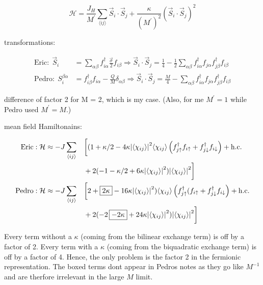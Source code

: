 \documentclass{article}
\begin{document}
\begin{equation}
\mathcal{H} = \frac{J_H}{M^\prime} \sum_{\langle ij \rangle} \vec{S}_i \cdot \vec{S}_j + \frac{\kappa}{\left(M^\prime\right)^2} \left(\vec{S}_i \cdot \vec{S}_j\right)^2
\end{equation}


transformations:

\begin{align}
\text{Eric}: \;\vec{S}_i &= \sum_{\alpha\beta} f_{i\alpha}^\dagger \frac{\vec{\sigma}}{2} f_{i\beta} \Rightarrow \vec{S}_i\cdot\vec{S}_j = \frac14 - \frac12 \sum_{\alpha\beta} f_{i\alpha}^\dagger f_{j\alpha} f_{j\beta}^\dagger f_{i\beta} \\
\text{Pedro}: \; S_i^{\beta \alpha} &= f_{i\beta}^\dagger f_{i\alpha} - \frac{Q}{M} \delta_{\alpha \beta} \Rightarrow \vec{S}_i \cdot \vec{S}_j = \frac{M}{4} - \sum_{\alpha \beta} f_{i\alpha}^\dagger f_{j\alpha} f_{j\beta}^\dagger f_{i\beta} 
\end{align}

difference of factor 2 for M = 2, which is my case. (Also, for me $M^\prime = 1$ while Pedro used $M^\prime = M$.) 

mean field Hamiltonains:

\begin{alignat}{2}
	\text{Eric}: \mathcal{H} &\approx -J\sum_{\langle ij \rangle} &&\bigg[ (1+\kappa/2 - 4\kappa\abs{\langle \chi_{ij} \rangle}^2 \langle \chi_{ij} \rangle \left( f_{j\uparrow}^\dagger f_{i\uparrow} + f_{j\downarrow}^\dagger f_{i\downarrow}\right) + \text{h.c.} \\
	& && +2(-1-\kappa/2 + 6\kappa \abs{\langle \chi_{ij} \rangle}^2) \abs{\langle \chi_{ij} \rangle}^2\bigg] \\
	\text{Pedro}: \mathcal{H} &\approx -J\sum_{\langle ij \rangle} &&\bigg[2+\boxed{2\kappa}-16\kappa \abs{\langle \chi_{ij} \rangle}^2) \langle \chi_{ij} \rangle \left( f_{j\uparrow}^\dagger (f_{i\uparrow} + f_{j\downarrow}^\dagger f_{i\downarrow}\right) + \text{h.c.} \\
	& && +2(-2 \, \boxed{-2\kappa} +24\kappa \abs{\langle \chi_{ij} \rangle}^2)\abs{\langle \chi_{ij} \rangle}^2 \bigg]
\end{alignat}

Every term without a $\kappa$ (coming from the bilinear exchange term) is off by a factor of 2. Every term with a $\kappa$ (coming from the biquadratic exchange term) is off by a factor of 4. Hence, the only problem is the factor 2 in the fermionic representation. The boxed terms dont appear in Pedros notes as they go like $M^{-1}$ and are therfore irrelevant in the large $M$ limit.
\end{document}
